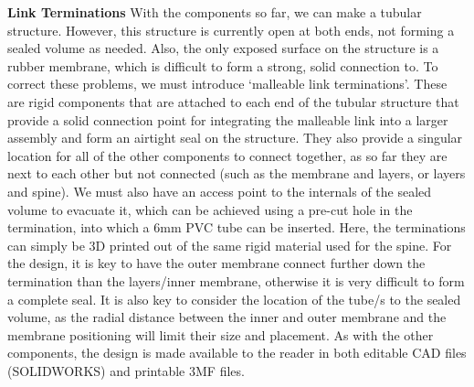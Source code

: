 \textbf{Link Terminations}
With the components so far, we can make a tubular structure. However, this structure is currently open at both ends, not forming a sealed volume as needed. Also, the only exposed surface on the structure is a rubber membrane, which is difficult to form a strong, solid connection to. To correct these problems, we must introduce ‘malleable link terminations’. These are rigid components that are attached to each end of the tubular structure that provide a solid connection point for integrating the malleable link into a larger assembly and form an airtight seal on the structure. They also provide a singular location for all of the other components to connect together, as so far they are next to each other but not connected (such as the membrane and layers, or layers and spine). We must also have an access point to the internals of the sealed volume to evacuate it, which can be achieved using a pre-cut hole in the termination, into which a 6mm PVC tube can be inserted. Here, the terminations can simply be 3D printed out of the same rigid material used for the spine. For the design, it is key to have the outer membrane connect further down the termination than the layers/inner membrane, otherwise it is very difficult to form a complete seal. It is also key to consider the location of the tube/s to the sealed volume, as the radial distance between the inner and outer membrane and the membrane positioning will limit their size and placement. As with the other components, the design is made available to the reader in both editable CAD files (SOLIDWORKS) and printable 3MF files.

